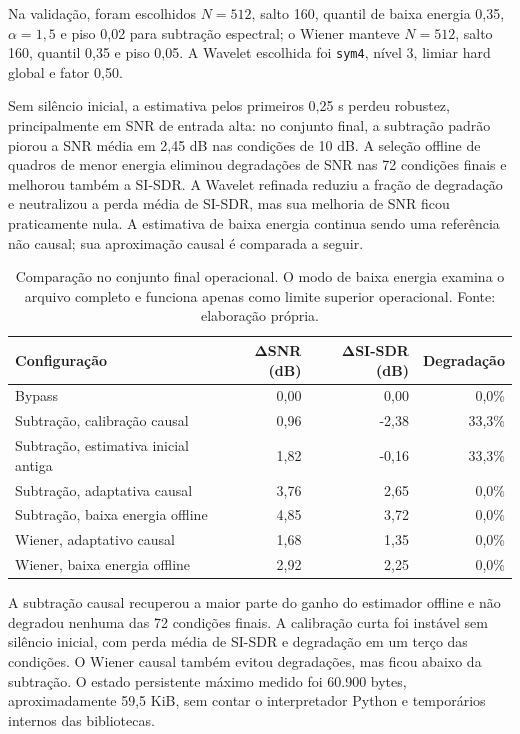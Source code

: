 Na validação, foram escolhidos \(N=512\), salto 160, quantil de baixa energia 0,35, \(\alpha=1{,}5\) e piso 0,02 para subtração espectral; o Wiener manteve \(N=512\), salto 160, quantil 0,35 e piso 0,05. A Wavelet escolhida foi \texttt{sym4}, nível 3, limiar hard global e fator 0,50.

Sem silêncio inicial, a estimativa pelos primeiros 0,25 s perdeu robustez, principalmente em SNR de entrada alta: no conjunto final, a subtração padrão piorou a SNR média em 2,45 dB nas condições de 10 dB. A seleção offline de quadros de menor energia eliminou degradações de SNR nas 72 condições finais e melhorou também a SI-SDR. A Wavelet refinada reduziu a fração de degradação e neutralizou a perda média de SI-SDR, mas sua melhoria de SNR ficou praticamente nula. A estimativa de baixa energia continua sendo uma referência não causal; sua aproximação causal é comparada a seguir.

\begin{table}[!htbp]
\centering
\caption[Comparação do estimador causal]{Comparação no conjunto final operacional. O modo de baixa energia examina o arquivo completo e funciona apenas como limite superior operacional. Fonte: elaboração própria.}
\label{tab:resultados-causal}
\footnotesize
\begin{tabularx}{\textwidth}{Xrrr}
\toprule
\textbf{Configuração} & \(\boldsymbol{\Delta}\)\textbf{SNR (dB)} & \(\boldsymbol{\Delta}\)\textbf{SI-SDR (dB)} & \textbf{Degradação} \\
\midrule
Bypass & 0,00 & 0,00 & 0,0\% \\
Subtração, calibração causal & 0,96 & -2,38 & 33,3\% \\
Subtração, estimativa inicial antiga & 1,82 & -0,16 & 33,3\% \\
Subtração, adaptativa causal & 3,76 & 2,65 & 0,0\% \\
Subtração, baixa energia offline & 4,85 & 3,72 & 0,0\% \\
Wiener, adaptativo causal & 1,68 & 1,35 & 0,0\% \\
Wiener, baixa energia offline & 2,92 & 2,25 & 0,0\% \\
\bottomrule
\end{tabularx}
\end{table}
\FloatBarrier

A subtração causal recuperou a maior parte do ganho do estimador offline e não degradou nenhuma das 72 condições finais. A calibração curta foi instável sem silêncio inicial, com perda média de SI-SDR e degradação em um terço das condições. O Wiener causal também evitou degradações, mas ficou abaixo da subtração. O estado persistente máximo medido foi 60.900 bytes, aproximadamente 59,5 KiB, sem contar o interpretador Python e temporários internos das bibliotecas.

